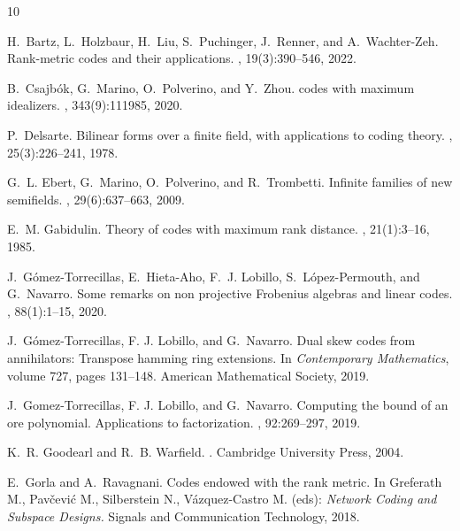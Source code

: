 \documentclass[a4paper, 11pt]{article}
\begin{document}
\begin{thebibliography}{10}

H.~Bartz, L.~Holzbaur, H.~Liu, S.~Puchinger, J.~Renner, and A.~Wachter-Zeh.
\newblock Rank-metric codes and their applications.
, 19(3):390--546, 2022.

B.~Csajb{\'o}k, G.~Marino, O.~Polverino, and Y.~Zhou.
 codes with maximum idealizers.
, 343(9):111985, 2020.

P.~Delsarte.
\newblock Bilinear forms over a finite field, with applications to coding
  theory.
, 25(3):226--241,
  1978.

G.~L. Ebert, G.~Marino, O.~Polverino, and R.~Trombetti.
\newblock Infinite families of new semifields.
, 29(6):637--663, 2009.

E.~M. Gabidulin.
\newblock Theory of codes with maximum rank distance.
, 21(1):3--16, 1985.

J.~G{\'o}mez-Torrecillas, E.~Hieta-Aho, F.~J. Lobillo, S.~L{\'o}pez-Permouth,
  and G.~Navarro.
\newblock Some remarks on non projective Frobenius algebras and linear codes.
, 88(1):1--15, 2020.

J.~G{\'o}mez-Torrecillas, F. J. Lobillo, and G.~Navarro.
\newblock Dual skew codes from annihilators: Transpose hamming ring extensions.
\newblock In {\em Contemporary Mathematics}, volume 727, pages 131--148.
  American Mathematical Society, 2019.

J.~Gomez-Torrecillas, F. J. Lobillo, and G.~Navarro.
\newblock Computing the bound of an ore polynomial. Applications to factorization.
, 92:269--297, 2019.

K.~R. Goodearl and R.~B. Warfield.
.
\newblock Cambridge University Press, 2004.

E.~Gorla and A.~Ravagnani.
\newblock Codes endowed with the rank metric.
\newblock In Greferath M., Pav{\v c}evi{\'c} M., Silberstein N.,
  V{\'a}zquez-Castro M. (eds): {\em Network Coding and Subspace Designs.} Signals and Communication Technology, 2018.


\end{thebibliography}
\end{document}
